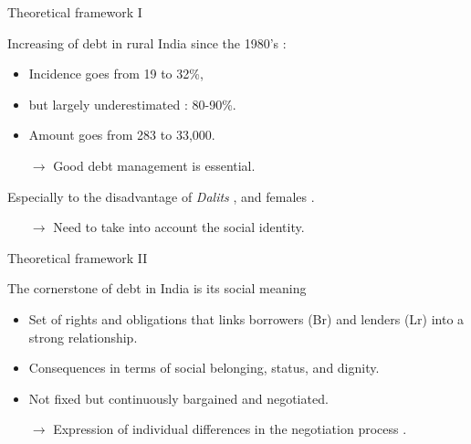 \documentclass[aspectratio=169]{beamer}
\begin{document}
\begin{frame}


\end{frame}




\begin{frame}{Theoretical framework I}

Increasing of debt in rural India since the 1980's \citep{Rajakumar2019}:
\begin{itemize}
\item Incidence goes from 19 to 32\%, 
\item but largely underestimated \citep{Jones1994}: 80-90\%.
\item Amount goes from 283 to 33,000.
\item[$\rightarrow$] Good debt management is essential.%
\end{itemize}


Especially to the disadvantage of \textit{Dalits} \citep{Kumar2013}, and females \citep{Reboul2021}.

\begin{itemize}
\item[$\rightarrow$] Need to take into account the social identity.
\end{itemize}

\end{frame}




\begin{frame}{Theoretical framework II}

The cornerstone of debt in India is its social meaning \citep{Guerin2014a}
\begin{itemize}
\item Set of rights and obligations that links borrowers (Br) and lenders (Lr) into a strong relationship.
\item Consequences in terms of social belonging, status, and dignity.
\item Not fixed but continuously bargained and negotiated.
\item[$\rightarrow$] Expression of individual differences in the negotiation process \citep{Elfenbein2015}.
\end{itemize}

\end{frame}
\end{document}
